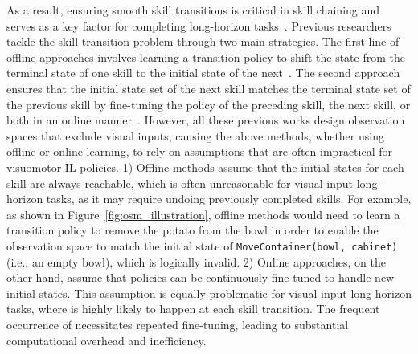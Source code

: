 As a result, ensuring smooth skill transitions is critical in skill chaining and serves as a key factor for completing long-horizon tasks~\cite{li2024auxiliary}.
Previous researchers tackle the skill transition problem through two main strategies. The first line of offline approaches involves learning a transition policy to shift the state from the terminal state of one skill to the initial state of the next~\cite{watahiki2022one, byun2021training, lee2019composing}.
%
The second approach ensures that the initial state set of the next skill matches the terminal state set of the previous skill by fine-tuning the policy of the preceding skill, the next skill, or both in an online manner~\cite{li2024auxiliary, chen2023sequential, lee2021adversarial}. However, all these previous works design observation spaces that exclude visual inputs,
causing the above methods, whether using offline or online learning, to rely on assumptions that are often impractical for visuomotor IL policies. 1) Offline methods assume that the initial states for each skill are always reachable, which is often unreasonable for visual-input long-horizon tasks, as it may require undoing previously completed skills. For example, as shown in Figure~\ref{fig:osm_illustration}, offline methods would need to learn a transition policy to remove the potato from the bowl in order to enable the observation space to match the initial state of \texttt{MoveContainer(bowl, cabinet)} (i.e., an empty bowl), which is logically invalid. 2) Online approaches, on the other hand, assume that policies can be continuously fine-tuned to handle new initial states. This assumption is equally problematic for visual-input long-horizon tasks, where \pb is highly likely to happen at each skill transition. The frequent occurrence of \pb necessitates repeated fine-tuning, leading to substantial computational overhead and inefficiency.


